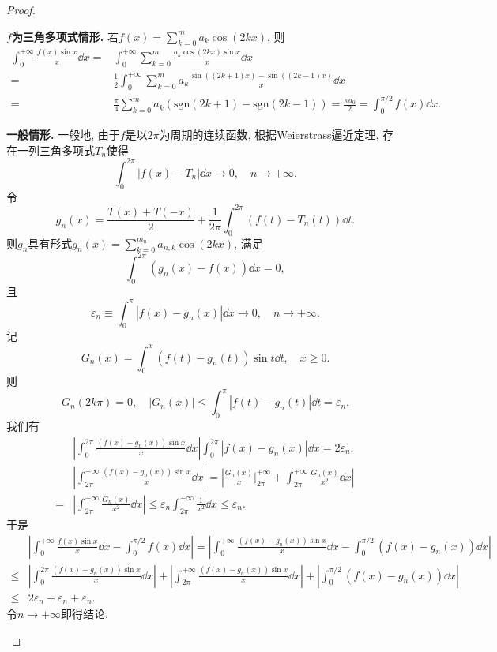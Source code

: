 \begin{quiza}
\begin{proof}
\begin{asparaenum}[(i)]
\item\textbf{\(f\)为三角多项式情形.} 若\(f(x)=\sum_{k=0}^{m}a_k\cos (2kx)\), 则\[\begin{split}
\int_{0}^{+\infty}\frac{f(x)\sin x}{x}\dd x=&\int_{0}^{+\infty}\sum_{k=0}^{m}\frac{a_k\cos(2kx)\sin x}{x}\dd x\\=&\frac{1}{2}\int_{0}^{+\infty}\sum_{k=0}^{m}a_k\frac{\sin\left((2k+1)x\right)-\sin\left((2k-1)x\right)}{x}\dd x\\=&\frac{\pi}{4}\sum_{k=0}^{m}a_k\left(\mathrm{sgn}(2k+1)-\mathrm{sgn}(2k-1)\right)=\frac{\pi a_0}{2}=\int_{0}^{\pi/2}f(x)\dd x.
\end{split}\]
\item\textbf{一般情形.} 一般地, 由于\(f\)是以\(2\pi\)为周期的连续函数, 根据Weierstrass逼近定理, 存在一列三角多项式\(T_n\)使得\[\int_{0}^{2\pi}\left|f(x)-T_n\right|\dd x\rightarrow 0,\quad n\rightarrow+\infty.\]令\[g_n(x)=\frac{T(x)+T(-x)}{2}+\frac{1}{2\pi}\int_{0}^{2\pi}\left(f(t)-T_n(t)\right)\dd t.\]则\(g_n\)具有形式\(g_n(x)=\sum_{k=0}^{m_n}a_{n,k}\cos(2kx)\), 满足\[\int_{0}^{2\pi}\left(g_n(x)-f(x)\right)\dd x=0,\]且\[\varepsilon_n\equiv\int_{0}^{\pi}\left|f(x)-g_n(x)\right|\dd x\rightarrow 0,\quad n\rightarrow+\infty.\]记\[G_n(x)=\int_{0}^{x}\left(f(t)-g_n(t)\right)\sin t\dd t,\quad x\geqslant 0.\]则\[G_n(2k\pi)=0,\quad\left|G_n(x)\right|\leqslant\int_{0}^{\pi}\left|f(t)-g_n(t)\right|\dd t=\varepsilon_n.\]我们有\[\begin{split}
&\left|\int_{0}^{2\pi}\frac{\left(f(x)-g_n(x)\right)\sin x}{x}\dd x\right|\int_{0}^{2\pi}\left|f(x)-g_n(x)\right|\dd x=2\varepsilon_n,\\
&\left|\int_{2\pi}^{+\infty}\frac{\left(f(x)-g_n(x)\right)\sin x}{x}\dd x\right|=\left|\frac{G_n(x)}{x}\Big|_{2\pi}^{+\infty}+\int_{2\pi}^{+\infty}\frac{G_n(x)}{x^2}\dd x\right|\\=&\left|\int_{2\pi}^{+\infty}\frac{G_n(x)}{x^2}\dd x\right|\leqslant\varepsilon_n\int_{2\pi}^{+\infty}\frac{1}{x^2}\dd x\leqslant \varepsilon_n.
\end{split}\]
于是\[\begin{split}
&\left|\int_{0}^{+\infty}\frac{f(x)\sin x}{x}\dd x-\int_{0}^{\pi/2}f(x)\dd x\right|=\left|\int_{0}^{+\infty}\frac{\left(f(x)-g_n(x)\right)\sin x}{x}\dd x-\int_{0}^{\pi/2}\left(f(x)-g_n(x)\right)\dd x\right|\\\leqslant & \left|\int_{0}^{2\pi}\frac{\left(f(x)-g_n(x)\right)\sin x}{x}\dd x\right|+\left|\int_{2\pi}^{+\infty}\frac{\left(f(x)-g_n(x)\right)\sin x}{x}\dd x\right|+\left|\int_{0}^{\pi/2}\left(f(x)-g_n(x)\right)\dd x\right|\\\leqslant &2\varepsilon_n+\varepsilon_n+\varepsilon_n.
\end{split}\]令\(n\rightarrow+\infty\)即得结论.
\end{asparaenum}


\end{proof}
\end{quiza}
